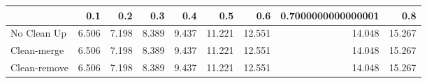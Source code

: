 \begin{tabular}{lrrrrrrrr}
\toprule
{} &   0.1 &   0.2 &   0.3 &   0.4 &    0.5 &    0.6 & 0.7000000000000001 &    0.8 \\
\midrule
No Clean Up  & 6.506 & 7.198 & 8.389 & 9.437 & 11.221 & 12.551 &             14.048 & 15.267 \\
Clean-merge  & 6.506 & 7.198 & 8.389 & 9.437 & 11.221 & 12.551 &             14.048 & 15.267 \\
Clean-remove & 6.506 & 7.198 & 8.389 & 9.437 & 11.221 & 12.551 &             14.048 & 15.267 \\
\bottomrule
\end{tabular}
